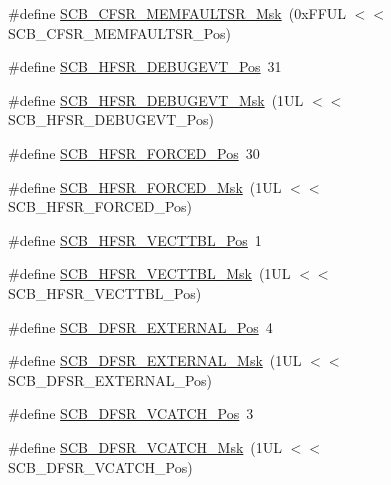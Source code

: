 \begin{DoxyCompactItemize}
\item 
\#define \hyperlink{group___c_m_s_i_s___s_c_b_gad46716159a3808c9e7da22067d6bec98}{S\+C\+B\+\_\+\+C\+F\+S\+R\+\_\+\+M\+E\+M\+F\+A\+U\+L\+T\+S\+R\+\_\+\+Msk}~(0x\+F\+F\+U\+L $<$$<$ S\+C\+B\+\_\+\+C\+F\+S\+R\+\_\+\+M\+E\+M\+F\+A\+U\+L\+T\+S\+R\+\_\+\+Pos)
\item 
\#define \hyperlink{group___c_m_s_i_s___s_c_b_ga300c90cfb7b35c82b4d44ad16c757ffb}{S\+C\+B\+\_\+\+H\+F\+S\+R\+\_\+\+D\+E\+B\+U\+G\+E\+V\+T\+\_\+\+Pos}~31
\item 
\#define \hyperlink{group___c_m_s_i_s___s_c_b_gababd60e94756bb33929d5e6f25d8dba3}{S\+C\+B\+\_\+\+H\+F\+S\+R\+\_\+\+D\+E\+B\+U\+G\+E\+V\+T\+\_\+\+Msk}~(1\+U\+L $<$$<$ S\+C\+B\+\_\+\+H\+F\+S\+R\+\_\+\+D\+E\+B\+U\+G\+E\+V\+T\+\_\+\+Pos)
\item 
\#define \hyperlink{group___c_m_s_i_s___s_c_b_gab361e54183a378474cb419ae2a55d6f4}{S\+C\+B\+\_\+\+H\+F\+S\+R\+\_\+\+F\+O\+R\+C\+E\+D\+\_\+\+Pos}~30
\item 
\#define \hyperlink{group___c_m_s_i_s___s_c_b_ga6560d97ed043bc01152a7247bafa3157}{S\+C\+B\+\_\+\+H\+F\+S\+R\+\_\+\+F\+O\+R\+C\+E\+D\+\_\+\+Msk}~(1\+U\+L $<$$<$ S\+C\+B\+\_\+\+H\+F\+S\+R\+\_\+\+F\+O\+R\+C\+E\+D\+\_\+\+Pos)
\item 
\#define \hyperlink{group___c_m_s_i_s___s_c_b_ga77993da8de35adea7bda6a4475f036ab}{S\+C\+B\+\_\+\+H\+F\+S\+R\+\_\+\+V\+E\+C\+T\+T\+B\+L\+\_\+\+Pos}~1
\item 
\#define \hyperlink{group___c_m_s_i_s___s_c_b_gaac5e289211d0a63fe879a9691cb9e1a9}{S\+C\+B\+\_\+\+H\+F\+S\+R\+\_\+\+V\+E\+C\+T\+T\+B\+L\+\_\+\+Msk}~(1\+U\+L $<$$<$ S\+C\+B\+\_\+\+H\+F\+S\+R\+\_\+\+V\+E\+C\+T\+T\+B\+L\+\_\+\+Pos)
\item 
\#define \hyperlink{group___c_m_s_i_s___s_c_b_ga13f502fb5ac673df9c287488c40b0c1d}{S\+C\+B\+\_\+\+D\+F\+S\+R\+\_\+\+E\+X\+T\+E\+R\+N\+A\+L\+\_\+\+Pos}~4
\item 
\#define \hyperlink{group___c_m_s_i_s___s_c_b_ga3cba2ec1f588ce0b10b191d6b0d23399}{S\+C\+B\+\_\+\+D\+F\+S\+R\+\_\+\+E\+X\+T\+E\+R\+N\+A\+L\+\_\+\+Msk}~(1\+U\+L $<$$<$ S\+C\+B\+\_\+\+D\+F\+S\+R\+\_\+\+E\+X\+T\+E\+R\+N\+A\+L\+\_\+\+Pos)
\item 
\#define \hyperlink{group___c_m_s_i_s___s_c_b_gad02d3eaf062ac184c18a7889c9b6de57}{S\+C\+B\+\_\+\+D\+F\+S\+R\+\_\+\+V\+C\+A\+T\+C\+H\+\_\+\+Pos}~3
\item 
\#define \hyperlink{group___c_m_s_i_s___s_c_b_gacbb931575c07b324ec793775b7c44d05}{S\+C\+B\+\_\+\+D\+F\+S\+R\+\_\+\+V\+C\+A\+T\+C\+H\+\_\+\+Msk}~(1\+U\+L $<$$<$ S\+C\+B\+\_\+\+D\+F\+S\+R\+\_\+\+V\+C\+A\+T\+C\+H\+\_\+\+Pos)

\end{DoxyCompactItemize}
